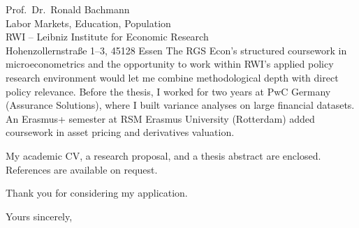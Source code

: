 \documentclass[a4paper,11pt]{letter}
\begin{document}
\begin{letter}{%
    Prof.\ Dr.\ Ronald Bachmann \\
    Labor Markets, Education, Population \\
    RWI -- Leibniz Institute for Economic Research \\
    Hohenzollernstra\ss e 1--3, 45128 Essen
}
The RGS Econ's structured coursework in microeconometrics and the opportunity to work within RWI's applied policy research environment would let me combine methodological depth with direct policy relevance. Before the thesis, I worked for two years at PwC Germany (Assurance Solutions), where I built variance analyses on large financial datasets. An Erasmus+ semester at RSM Erasmus University (Rotterdam) added coursework in asset pricing and derivatives valuation.

My academic CV, a research proposal, and a thesis abstract are enclosed. References are available on request.

Thank you for considering my application.

\closing{Yours sincerely,}

\end{letter}
\end{document}
